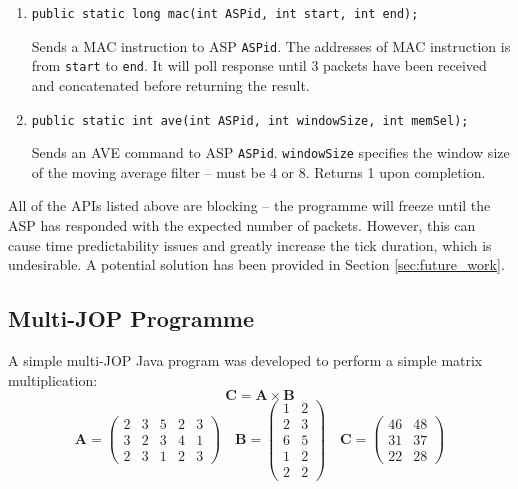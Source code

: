 \documentclass[]{article}
\begin{document}
\begin{enumerate}
		\item \texttt{public static long mac(int ASPid, int start, int end);}\par
		Sends a MAC instruction to ASP \texttt{ASPid}. The addresses of MAC instruction is from \texttt{start} to \texttt{end}. It will poll response until 3 packets have been received and concatenated before returning the result.\par \par
		
		\item \texttt{public static int ave(int ASPid, int windowSize, int memSel);}\par
		Sends an AVE command to ASP \texttt{ASPid}. \texttt{windowSize} specifies the window size of the moving average filter -- must be 4 or 8. Returns 1 upon completion. \par \par
		
	\end{enumerate}
	
	All of the APIs listed above are blocking -- the programme will freeze until the ASP has responded with the expected number of packets. However, this can cause time predictability issues and greatly increase the tick duration, which is undesirable. A potential solution has been provided in Section \ref{sec:future_work}.
	
	
	
	
	\subsection{Multi-JOP Programme}
	
	A simple multi-JOP Java program was developed to perform a simple matrix multiplication:
	\begin{equation}
	\textbf{C} = \textbf{A} \times \textbf{B}
	\end{equation}
	\begin{equation}
	\textbf{A} = \begin{pmatrix}    2&3&5&2&3\\    3&2&3&4&1 \\ 2&3&1&2&3    \end{pmatrix}
	\quad
	\textbf{B} = \begin{pmatrix} 1&2 \\ 2&3 \\ 6&5 \\ 1&2 \\ 2&2 \end{pmatrix}
	\quad
	\textbf{C} = \begin{pmatrix} 46&48 \\ 31&37 \\22&28 \end{pmatrix}
	\end{equation}
	
\end{document}
